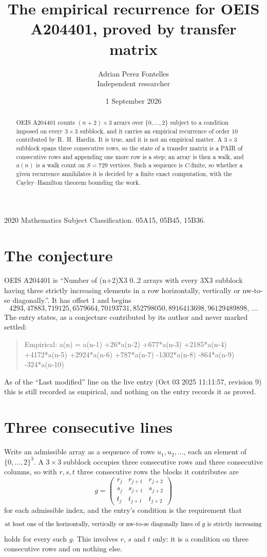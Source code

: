 \documentclass[11pt,a4paper]{article}
\title{The empirical recurrence for OEIS A204401, proved by transfer matrix}
\author{Adrian Perez Fontelles\\ \small Independent researcher}
\date{1 September 2026}
\theoremstyle{plain}
\theoremstyle{definition}
\begin{document}
\maketitle

\begin{abstract}
OEIS A204401 counts $(n+2)\times3$ arrays over $\{0,\dots,2\}$ subject to a condition imposed on
every $3\times3$ subblock, and it carries an empirical recurrence of order $10$
contributed by R.~H.~Hardin. It is true, and it is not an empirical matter. A $3\times3$
subblock spans three consecutive rows, so the state of a transfer matrix is a PAIR of
consecutive rows and appending one more row is a step; an array is then a walk, and
$a(n)$ is a walk count on $S=729$ vertices. Such a sequence is $C$-finite, so whether a given
recurrence annihilates it is decided by a finite exact computation, with the Cayley--Hamilton
theorem bounding the work.
\end{abstract}

\noindent\small 2020 Mathematics Subject Classification. 05A15, 05B45, 15B36.\normalsize

\section{The conjecture}

OEIS A204401 is ``Number of (n+2)X3 0..2 arrays with every 3X3 subblock having three strictly increasing elements in a row horizontally, vertically or nw-to-se diagonally.''. It has offset $1$ and begins
\[
4293, 47883, 719125, 6579664, 70193731, 852798050, 8916413698, 96129489898,\ \dots
\]
The entry states, as a conjecture contributed by its author and never marked settled:
\begin{quote}
Empirical: a(n) = a(n-1) +26*a(n-2) +677*a(n-3) +2185*a(n-4) +4172*a(n-5) +2924*a(n-6) +787*a(n-7) -1302*a(n-8) -864*a(n-9) -324*a(n-10)
\end{quote}
As of the ``Last modified'' line on the live entry (Oct 03 2025 11:11:57, revision 9) this is still
recorded as empirical, and nothing on the entry records it as proved.

\section{Three consecutive lines}

Write an admissible array as a sequence of rows $u_1,u_2,\dots$, each an element of
$\{0,\dots,2\}^{3}$. A $3\times3$ subblock occupies three consecutive rows and
three consecutive columns, so with $r,s,t$ three consecutive rows the blocks it
contributes are
\[
g=\begin{pmatrix}r_j&r_{j+1}&r_{j+2}\\ s_j&s_{j+1}&s_{j+2}\\ t_j&t_{j+1}&t_{j+2}\end{pmatrix}
\]
for each admissible index, and the entry's condition is the requirement that
\[
\text{at least one}\text{ of the horizontally, vertically or nw-to-se diagonally lines of }g\text{ \text{is strictly increasing}}
\]
holds for every such $g$. This involves $r$, $s$ and $t$ only: it is a condition on
three consecutive rows and on nothing else.
\end{document}
